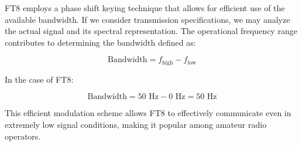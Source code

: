 FT8 employs a phase shift keying technique that allows for efficient use of the available bandwidth. If we consider transmission specifications, we may analyze the actual signal and its spectral representation. The operational frequency range contributes to determining the bandwidth defined as:

\[
\text{Bandwidth} = f_{\text{high}} - f_{\text{low}}
\]

In the case of FT8:

\[
\text{Bandwidth} = 50 \text{ Hz} - 0 \text{ Hz} = 50 \text{ Hz}
\]

This efficient modulation scheme allows FT8 to effectively communicate even in extremely low signal conditions, making it popular among amateur radio operators.

